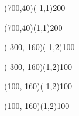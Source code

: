 \documentclass[12pt]{article}
\begin{document}
\begin{figure}[htb]
\begin{egame}
\putbranch(700,40)(-1,1){200}

\renewcommand{\egarrowstyle}{e}

\putbranch(700,40)(1,1){200}

\renewcommand{\egarrowstyle}{}

\putbranch(-300,-160)(-1,2){100}

\renewcommand{\egarrowstyle}{}

\putbranch(-300,-160)(1,2){100}

\renewcommand{\egarrowstyle}{}

\putbranch(100,-160)(-1,2){100}

\renewcommand{\egarrowstyle}{e}

\putbranch(100,-160)(1,2){100}

\renewcommand{\egarrowstyle}{}


\end{egame}
\end{figure}
\end{document}
